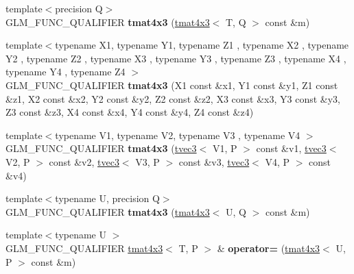 \begin{DoxyCompactItemize}
\item 
{\footnotesize template$<$precision Q$>$ }\\G\+L\+M\+\_\+\+F\+U\+N\+C\+\_\+\+Q\+U\+A\+L\+I\+F\+I\+ER {\bfseries tmat4x3} (\hyperlink{structglm_1_1detail_1_1tmat4x3}{tmat4x3}$<$ T, Q $>$ const \&m)\hypertarget{structglm_1_1detail_1_1tmat4x3_a75a5dd17c1376eaaf218a98be462222d}{}\label{structglm_1_1detail_1_1tmat4x3_a75a5dd17c1376eaaf218a98be462222d}

\item 
{\footnotesize template$<$typename X1, typename Y1, typename Z1 , typename X2 , typename Y2 , typename Z2 , typename X3 , typename Y3 , typename Z3 , typename X4 , typename Y4 , typename Z4 $>$ }\\G\+L\+M\+\_\+\+F\+U\+N\+C\+\_\+\+Q\+U\+A\+L\+I\+F\+I\+ER {\bfseries tmat4x3} (X1 const \&x1, Y1 const \&y1, Z1 const \&z1, X2 const \&x2, Y2 const \&y2, Z2 const \&z2, X3 const \&x3, Y3 const \&y3, Z3 const \&z3, X4 const \&x4, Y4 const \&y4, Z4 const \&z4)\hypertarget{structglm_1_1detail_1_1tmat4x3_a8b97a242c1d393f68f96995318bb0247}{}\label{structglm_1_1detail_1_1tmat4x3_a8b97a242c1d393f68f96995318bb0247}

\item 
{\footnotesize template$<$typename V1, typename V2, typename V3 , typename V4 $>$ }\\G\+L\+M\+\_\+\+F\+U\+N\+C\+\_\+\+Q\+U\+A\+L\+I\+F\+I\+ER {\bfseries tmat4x3} (\hyperlink{structglm_1_1detail_1_1tvec3}{tvec3}$<$ V1, P $>$ const \&v1, \hyperlink{structglm_1_1detail_1_1tvec3}{tvec3}$<$ V2, P $>$ const \&v2, \hyperlink{structglm_1_1detail_1_1tvec3}{tvec3}$<$ V3, P $>$ const \&v3, \hyperlink{structglm_1_1detail_1_1tvec3}{tvec3}$<$ V4, P $>$ const \&v4)\hypertarget{structglm_1_1detail_1_1tmat4x3_a855ee129fe5ef20aa994a3121996b09a}{}\label{structglm_1_1detail_1_1tmat4x3_a855ee129fe5ef20aa994a3121996b09a}

\item 
{\footnotesize template$<$typename U, precision Q$>$ }\\G\+L\+M\+\_\+\+F\+U\+N\+C\+\_\+\+Q\+U\+A\+L\+I\+F\+I\+ER {\bfseries tmat4x3} (\hyperlink{structglm_1_1detail_1_1tmat4x3}{tmat4x3}$<$ U, Q $>$ const \&m)\hypertarget{structglm_1_1detail_1_1tmat4x3_a52fb0f3d88fbe4449d065ac3c9dc0984}{}\label{structglm_1_1detail_1_1tmat4x3_a52fb0f3d88fbe4449d065ac3c9dc0984}

\item 
{\footnotesize template$<$typename U $>$ }\\G\+L\+M\+\_\+\+F\+U\+N\+C\+\_\+\+Q\+U\+A\+L\+I\+F\+I\+ER \hyperlink{structglm_1_1detail_1_1tmat4x3}{tmat4x3}$<$ T, P $>$ \& {\bfseries operator=} (\hyperlink{structglm_1_1detail_1_1tmat4x3}{tmat4x3}$<$ U, P $>$ const \&m)\hypertarget{structglm_1_1detail_1_1tmat4x3_a887443085fbd9cd29710306c99edede2}{}\label{structglm_1_1detail_1_1tmat4x3_a887443085fbd9cd29710306c99edede2}


\end{DoxyCompactItemize}
